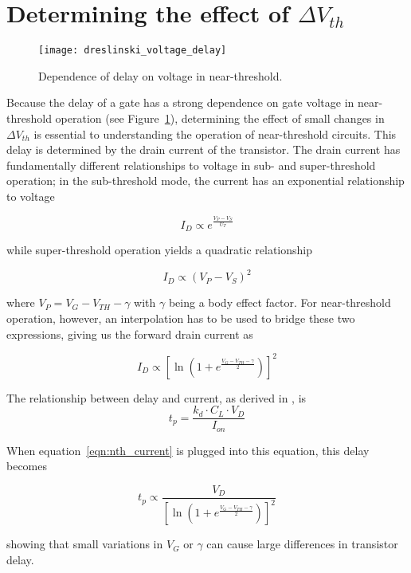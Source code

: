 \section{Determining the effect of $\Delta V_{th}$}
\label{sec:deltavth}

\begin{figure}[thpb]
    \centering
    \texttt{[image: dreslinski\_voltage\_delay]}
    \caption{Dependence of delay on voltage in near-threshold.~\cite{Dreslinski:2010ez}}
    \label{fig:voltage_delay}
\end{figure}
Because the delay of a gate has a strong dependence on gate voltage in near-threshold operation (see Figure~\ref{fig:voltage_delay}), determining the effect of small changes in $\Delta V_{th}$ is essential to understanding the operation of near-threshold circuits.
This delay is determined by the drain current of the transistor.
The drain current has fundamentally different relationships to voltage in sub- and super-threshold operation; in the sub-threshold mode, the current has an exponential relationship to voltage~\cite{Enz:1995vs} 

\begin{equation}
I_D \propto e^\frac{V_P-V_S}{U_T}
\end{equation}

while super-threshold operation yields a quadratic relationship

\begin{equation}
I_D \propto (V_P-V_S)^2
\end{equation}

where $V_P=V_G-V_{TH}-\gamma$ with $\gamma$ being a body effect factor. 
For near-threshold operation, however, an interpolation has to be used to bridge these two expressions\cite{Enz:1995vs}, giving us the forward drain current as

\begin{equation}
\label{eqn:nth_current}
I_D \propto \left[\ln\left(1+e^\frac{V_G-V_{TH}-\gamma}{2}\right)\right]^2
\end{equation}

The relationship between delay and current, as derived in \cite{Hanson:2007uu}, is
\begin{equation}
t_p = \frac{k_d\cdot C_L\cdot V_D}{I_{on}}
\end{equation}

When equation~\ref{eqn:nth_current} is plugged into this equation, this delay becomes

\begin{equation}
\label{eqn:nth_delay}
t_p\propto\frac{V_D}{\left[\ln\left(1+e^\frac{V_G-V_{TH}-\gamma}{2}\right)\right]^2}
\end{equation}
 
 showing that small variations in $V_G$ or $\gamma$ can cause large differences in transistor delay.
